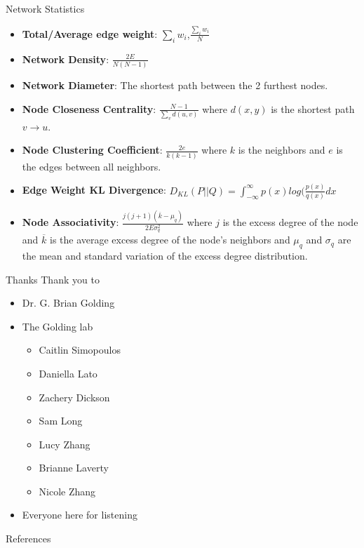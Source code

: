 \documentclass[dvipsnames]{beamer}
\begin{document}
\begin{frame}[fragile]{Network Statistics}
    \begin{itemize}
        \item<2-> \textbf{Total/Average edge weight}: $\sum_i w_i$,$\frac{\sum_i w_i}{N}$
        \item<3-> \textbf{Network Density}: $\frac{2E}{N(N-1)}$
        \item<4-> \textbf{Network Diameter}: The shortest path between the 2 furthest nodes.
        \item<5-> \textbf{Node Closeness Centrality}: $\frac{N-1}{\sum_v d(u,v)}$ where $d(x,y)$ is the shortest path $v \to u$.
        \item<6-> \textbf{Node Clustering Coefficient}: $\frac{2e}{k(k-1)}$ where $k$ is the neighbors and $e$ is the edges between all neighbors.
        \item<7-> \textbf{Edge Weight KL Divergence}: $D_{KL}(P||Q)= \int_{-\infty}^{\infty} p(x)log(\frac{p(x)}{q(x)}dx$
        \item<8-> \textbf{Node Associativity}: $\frac{j(j+1)(\overline{k}-\mu_q)}{2E\sigma^2_q}$ where $j$ is the excess degree of the node and $\overline{k}$ is the average excess degree of the node's neighbors and $\mu_q$ and $\sigma_q$ are the mean and standard variation of the excess degree distribution.
    \end{itemize}
\end{frame}
\begin{frame}{Thanks}
    Thank you to
    \begin{itemize}
        \item Dr. G. Brian Golding
        \item The Golding lab
            \begin{itemize}
                \item Caitlin Simopoulos
                \item Daniella Lato
                \item Zachery Dickson
                \item Sam Long
                \item Lucy Zhang
                \item Brianne Laverty
                \item Nicole Zhang
            \end{itemize}
        \item Everyone here for listening
    \end{itemize}
\end{frame}
\begin{frame}{References}
    \printbibliography
\end{frame}
\end{document}
